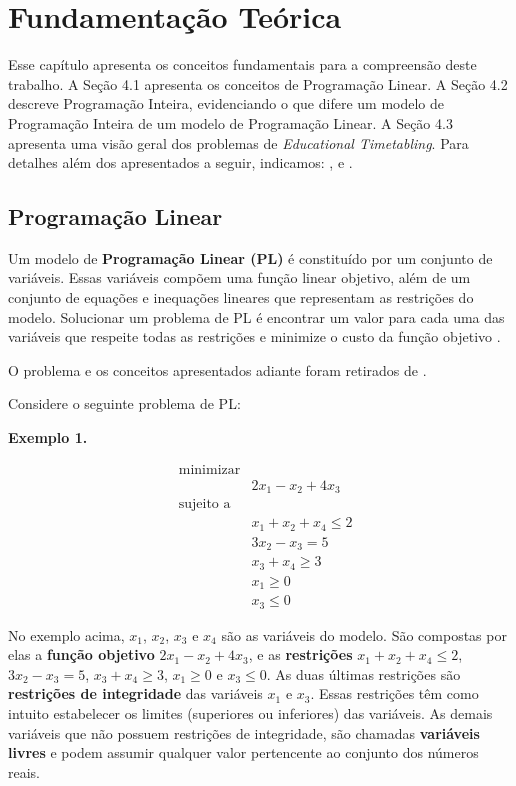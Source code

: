 \chapter{Fundamentação Teórica}
\label{cap:fundamentacao-teorica}

Esse capítulo apresenta os conceitos fundamentais para a compreensão deste trabalho. A Seção 4.1 apresenta os conceitos de Programação Linear. A Seção 4.2 descreve Programação Inteira, evidenciando o que difere um modelo de Programação Inteira de um modelo de Programação Linear. A Seção 4.3 apresenta uma visão geral dos problemas de \textit{Educational Timetabling}. Para detalhes além dos apresentados a seguir, indicamos: ,   e .

\section{Programação Linear}

Um modelo de \textbf{Programação Linear (PL)} é constituído por um conjunto de variáveis. Essas variáveis compõem uma função linear objetivo, além de um conjunto de equações e inequações lineares que representam as restrições do modelo. Solucionar um problema de PL é encontrar um valor para cada uma das variáveis que respeite todas as restrições e minimize o custo da função objetivo \cite{bertsimas1997introduction}. 

O problema e os conceitos apresentados adiante foram retirados de .

Considere o seguinte problema de PL:

\textbf{Exemplo 1.}

\begin{equation*}
\begin{aligned}
& \text{minimizar} \\
& &  2x_1 - x_2 + 4x_3 \\
& \text{sujeito a} \\
& & x_1 + x_2 + x_4 \leq 2 \\
& & 3x_2 - x_3 = 5 \\
& & x_3 + x_4 \geq 3 \\
& & x_1 \geq 0 \\ 
& & x_3 \leq 0
\end{aligned}
\end{equation*}

No exemplo acima, $x_1$, $x_2$, $x_3$ e $x_4$ são as variáveis do modelo. São compostas por elas a \textbf{função objetivo} $2x_1 - x_2 + 4x_3$, e as \textbf{restrições} $x_1 + x_2 + x_4 \leq 2$, $3x_2 - x_3 = 5$, $x_3 + x_4 \geq 3$, $x_1 \geq 0$ e $x_3 \leq 0$. As duas últimas restrições são \textbf{restrições de integridade} das variáveis $x_1$ e $x_3$. Essas restrições têm como intuito estabelecer os limites (superiores ou inferiores) das variáveis. As demais variáveis que não possuem restrições de integridade, são chamadas \textbf{variáveis livres} e podem assumir qualquer valor  pertencente ao conjunto dos números reais. 

